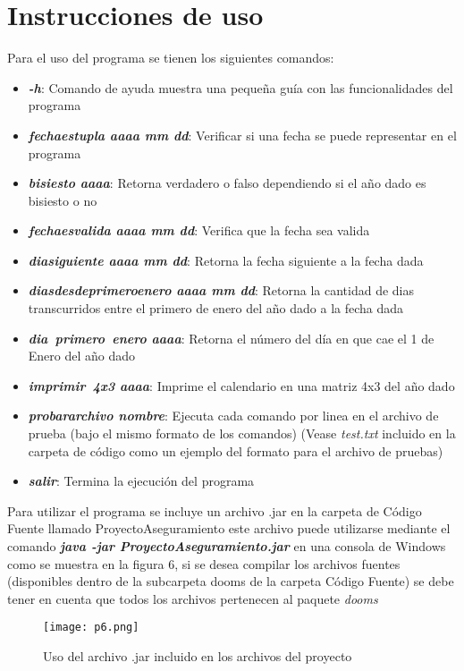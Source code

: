 \documentclass[10pt,journal,compsoc]{IEEEtran}
\begin{document}
\section{Instrucciones de uso}
\par Para el uso del programa se tienen los siguientes comandos:
\begin{itemize}
	\item \textbf{\textit{-h}}: Comando de ayuda muestra una pequeña guía con las funcionalidades del programa
	\item \textbf{\textit{fecha\textunderscore es\textunderscore tupla aaaa mm dd}}: Verificar si una fecha se puede representar en el programa
	\item \textbf{\textit{bisiesto aaaa}}: Retorna verdadero o falso dependiendo si el año dado es bisiesto o no
	\item \textbf{\textit{fecha\textunderscore es\textunderscore valida aaaa mm dd}}: Verifica que la fecha sea valida
	\item \textbf{\textit{dia\textunderscore siguiente aaaa mm dd}}: Retorna la fecha siguiente a la fecha dada
	\item \textbf{\textit{dias\textunderscore desde\textunderscore primero\textunderscore enero aaaa mm dd}}: Retorna la cantidad de dias transcurridos entre el primero de enero del año dado a la fecha dada
	\item \textbf{\textit{dia\textunderscore~primero\textunderscore~enero aaaa}}: Retorna el número del día en que cae el 1 de Enero del año dado
	\item \textbf{\textit{imprimir\textunderscore~4x3 aaaa}}: Imprime el calendario en una matriz 4x3 del año dado
	\item \textbf{\textit{probar\textunderscore archivo nombre}}: Ejecuta cada comando por linea en el archivo de prueba (bajo el mismo formato de los comandos) (Vease \textit{test.txt} incluido en la carpeta de código como un ejemplo del formato para el archivo de pruebas)
	\item \textbf{\textit{salir}}: Termina la ejecución del programa
\end{itemize}
\par Para utilizar el programa se incluye un archivo .jar en la carpeta de Código Fuente llamado ProyectoAseguramiento este archivo puede utilizarse mediante el comando \textit{\textbf{java -jar ProyectoAseguramiento.jar}} en una consola de Windows como se muestra en la figura 6, si se desea compilar los archivos fuentes (disponibles dentro de la subcarpeta dooms de la carpeta Código Fuente) se debe tener en cuenta que todos los archivos pertenecen al paquete \textit{dooms}
\begin{figure}[h!]
	\centering
	\texttt{[image: p6.png]}
	\caption{Uso del archivo .jar incluido en los archivos del proyecto}
\end{figure}
\end{document}
